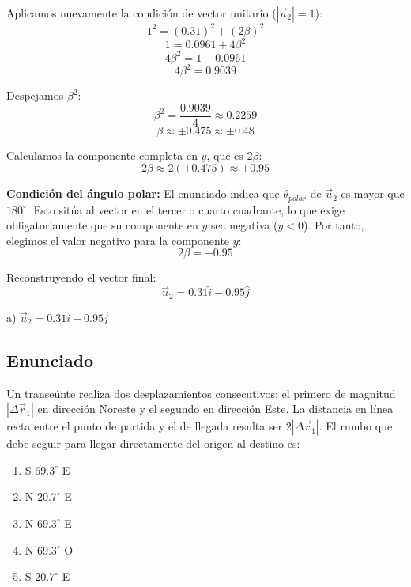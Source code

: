 \documentclass[12pt, a4paper]{article}
\begin{document}
Aplicamos nuevamente la condición de vector unitario ($|\vec{u}_2| = 1$):
$$1^2 = (0.31)^2 + (2\beta)^2$$
$$1 = 0.0961 + 4\beta^2$$
$$4\beta^2 = 1 - 0.0961$$
$$4\beta^2 = 0.9039$$

Despejamos $\beta^2$:
$$\beta^2 = \frac{0.9039}{4} \approx 0.2259$$
$$\beta \approx \pm 0.475 \approx \pm 0.48$$

Calculamos la componente completa en $y$, que es $2\beta$:
$$2\beta \approx 2(\pm 0.475) \approx \pm 0.95$$

\textbf{Condición del ángulo polar:} El enunciado indica que $\theta_{polar}$ de $\vec{u}_2$ es mayor que $180^\circ$. Esto sitúa al vector en el tercer o cuarto cuadrante, lo que exige obligatoriamente que su componente en $y$ sea negativa ($y < 0$).
Por tanto, elegimos el valor negativo para la componente $y$:
$$2\beta = -0.95$$

Reconstruyendo el vector final:
$$\vec{u}_2 = 0.31\hat{i} - 0.95\hat{j}$$

\begin{tcolorbox}[colback=green!5!white, colframe=green!50!black, title=Respuesta Final]
\centering \Large a) $\vec{u}_2 = 0.31\hat{i} - 0.95\hat{j}$
\end{tcolorbox}

\newpage

\subsection*{Enunciado}
Un transeúnte realiza dos desplazamientos consecutivos: el primero de magnitud $|\Delta\vec{r}_1|$ en dirección Noreste y el segundo en dirección Este. La distancia en línea recta entre el punto de partida y el de llegada resulta ser $2|\Delta\vec{r}_1|$. El rumbo que debe seguir para llegar directamente del origen al destino es:

\begin{enumerate}[label=\alph*)]
    \item S $69.3^\circ$ E
    \item N $20.7^\circ$ E
    \item N $69.3^\circ$ E
    \item N $69.3^\circ$ O
    \item S $20.7^\circ$ E
\end{enumerate}
\end{document}
